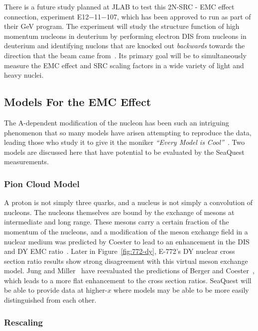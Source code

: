 There is a future study planned at JLAB to test this 2N-SRC - EMC effect connection, experiment E12−11−107, which has been approved to run as part of their \unit[12]{GeV} program. The experiment will study the structure function of high momentum nucleons in deuterium by performing electron DIS from nucleons in deuterium and identifying nuclons that are knocked out \emph{backwards} towards the direction that the beam came from~\cite{Hen:2014vua}. Its primary goal will be to simultaneously measure the EMC effect and SRC scaling factors in a wide variety of light and heavy nuclei.

\subsection{Models For the EMC Effect}

The A-dependent modification of the nucleon has been such an intriguing phenomenon that so many models have arisen attempting to reproduce the data, leading those who study it to give it the moniker \emph{``Every Model is Cool''}~\cite{Miller:1988hj}. Two models are discussed here that have potential to be evaluated by the SeaQuest measurements.

\subsubsection{Pion Cloud Model}

A proton is not simply three quarks, and a nucleus is not simply a convolution of nucleons. The nucleons themselves are bound by the exchange of mesons at intermediate and long range. These mesons carry a certain fraction of the momentum of the nucleons, and a modification of the meson exchange field in a nuclear medium was predicted by Coester to lead to an enhancement in the DIS and DY EMC ratio~\cite{Berger:1985dr}. Later in Figure~\ref{fig:772-dy}, E-772's DY nuclear cross section ratio results show strong disagreement with this virtual meson exchange model. Jung and Miller~\cite{Jung:1990pu} have reevaluated the predictions of Berger and Coester~\cite{Berger:1985dr}, which leads to a more flat enhancement to the cross section ratios. SeaQuest will be able to provide data at higher-$x$ where models may be able to be more easily distinguished from each other.

\subsubsection{Rescaling}

